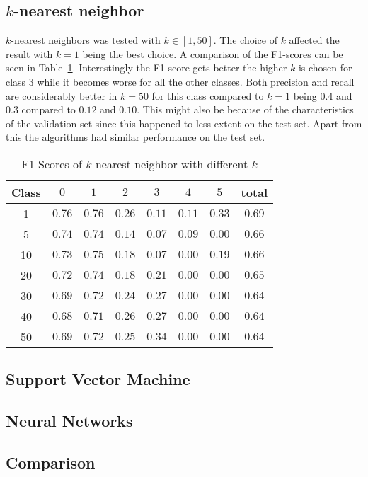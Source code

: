 \subsection{$k$-nearest neighbor}
$k$-nearest neighbors was tested with $k \in [1,50]$. The choice of $k$ affected the result with $k=1$ being the best choice. A comparison of the F1-scores can be seen in Table~\ref{ds2:table:knnf1}. Interestingly the F1-score gets better the higher $k$ is chosen for class $3$ while it becomes worse for all the other classes. Both precision and recall are considerably better in $k=50$ for this class compared to $k=1$
being $0.4$ and $0.3$ compared to $0.12$ and $0.10$. This might also be because of the characteristics of the validation set since this happened to less extent on the test set. Apart from this the algorithms had similar performance on the test set.
\begin{table}[p]
	\begin{center}
		\begin{tabular}{|c|c|c|c|c|c|c|c|}
\hline Class & $0$ & $1$ & $2$ & $3$ &$4$  &$ 5$ & total \\
\hline 1 & $0.76$ & $0.76$ & $0.26$ & $0.11$ & $0.11$ & $0.33$ & $0.69$ \\
\hline 5 & $0.74$ & $0.74$ & $0.14$ & $0.07$ & $0.09$ & $0.00$ & $0.66$ \\
\hline 10 & $0.73$ & $0.75$ &$0.18$ & $0.07$ & $0.00$ & $0.19$ & $0.66$ \\
\hline 20 & $0.72$ & $0.74$ &$0.18$ & $0.21$ & $0.00$ &	$0.00$ & $0.65$ \\
\hline 30 & $0.69$ & $0.72$ &$0.24$ & $0.27$ & $0.00$ & $0.00$ & $0.64$ \\
\hline 40 & $0.68$ & $0.71$ &$0.26$ &	$0.27$ & $0.00$ & $0.00$ & $0.64$ \\
\hline 50 & $0.69$ & $0.72$ &$0.25$ & $0.34$ & $0.00$ & $0.00$ & $0.64$ \\
\hline
	\end{tabular}
	\end{center}
	\caption{F1-Scores of $k$-nearest neighbor with different $k$\label{ds2:table:knnf1}}
\end{table}\subsection{Support Vector Machine}

\subsection{Neural Networks}

\subsection{Comparison}
\label{ds2:sec:comparison}
